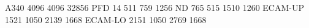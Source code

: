 A340 4096 4096 32856
PFD       14  511  759 1256
ND       765  515 1510 1260
ECAM-UP 1521 1050 2139 1668
ECAM-LO 2151 1050 2769 1668
